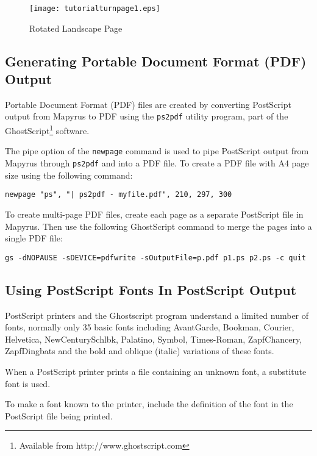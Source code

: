 

\begin{figure}[htb]
\texttt{[image: tutorialturnpage1.eps]}
\caption{Rotated Landscape Page}
\label{tutorialturnpage1}
\end{figure}

\subsection{Generating Portable Document Format (PDF) Output}
\label{pdf}


Portable Document Format (PDF) files are created by converting PostScript
output from Mapyrus to PDF using the \texttt{ps2pdf} utility program, part of
the GhostScript\footnote{Available from http://www.ghostscript.com} software.

The pipe option of the \texttt{newpage} command is used to pipe PostScript
output from Mapyrus through \texttt{ps2pdf} and into a PDF file.  To create
a PDF file with A4 page size using the following command:

\begin{verbatim}
newpage "ps", "| ps2pdf - myfile.pdf", 210, 297, 300
\end{verbatim}

To create multi-page PDF files, create each page as a separate
PostScript file in Mapyrus.  Then use the following GhostScript command to
merge the pages into a single PDF file:

\begin{verbatim}
gs -dNOPAUSE -sDEVICE=pdfwrite -sOutputFile=p.pdf p1.ps p2.ps -c quit
\end{verbatim}

\subsection{Using PostScript Fonts In PostScript Output}
\label{psfonts}

PostScript printers and the Ghostscript program
understand a limited number of fonts,
normally only 35 basic fonts including
AvantGarde,
Bookman,
Courier,
Helvetica,
NewCenturySchlbk,
Palatino,
Symbol,
Times-Roman,
ZapfChancery,
ZapfDingbats
and the bold
and oblique (italic) variations of these fonts.

When a PostScript printer prints a file containing an unknown font,
a substitute font is used.

To make a font known to the printer, include the definition of
the font in the PostScript file being printed.


